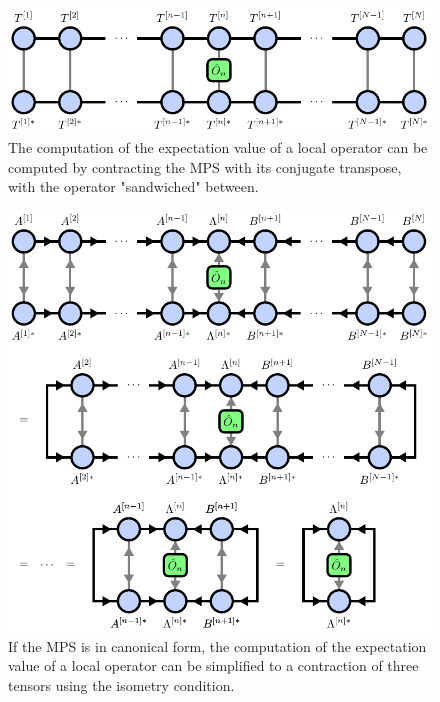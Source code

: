 \begin{figure}
	\centering
	\includegraphics[scale=1]{figures/tikz/Tensor_Networks/mps_local_expectation_value/mps_local_expectation_value.pdf}
	\caption{The computation of the expectation value of a local operator can be computed by contracting the MPS with its conjugate transpose, with the operator "sandwiched" between.}
	\label{fig:mps_local_expectation_value}
\end{figure}
\begin{figure}
	\centering
	\includegraphics[scale=1.0]{figures/tikz/Tensor_Networks/mps_canonical_form_local_expectation_value/mps_canonical_form_local_expectation_value.pdf}
	\caption{If the MPS is in canonical form, the computation of the expectation value of a local operator can be simplified to a contraction of three tensors using the isometry condition.}
	\label{fig:mps_local_expectation_value_canonical}
\end{figure}
